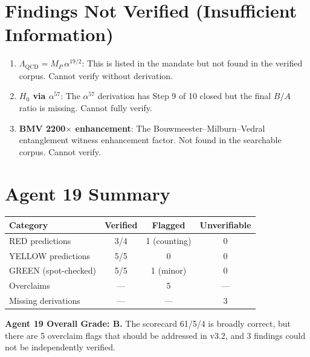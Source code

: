 \documentclass[11pt,a4paper]{article}
\begin{document}
\section{Findings Not Verified (Insufficient Information)}

\begin{enumerate}
\item \textbf{$\Lambda_{\mathrm{QCD}} = M_P\,\alpha^{19/2}$}: This is listed in the mandate but not found in the verified corpus. Cannot verify without derivation.

\item \textbf{$H_0$ via $\alpha^{57}$}: The $\alpha^{57}$ derivation has Step 9 of 10 closed but the final $B/A$ ratio is missing. Cannot fully verify.

\item \textbf{BMV 2200$\times$ enhancement}: The Bouwmeester--Milburn--Vedral entanglement witness enhancement factor. Not found in the searchable corpus. Cannot verify.
\end{enumerate}

\section{Agent 19 Summary}

\begin{center}
\begin{tabular}{lccc}
\toprule
\textbf{Category} & \textbf{Verified} & \textbf{Flagged} & \textbf{Unverifiable} \\
\midrule
RED predictions & 3/4 & 1 (counting) & 0 \\
YELLOW predictions & 5/5 & 0 & 0 \\
GREEN (spot-checked) & 5/5 & 1 (minor) & 0 \\
Overclaims & --- & 5 & --- \\
Missing derivations & --- & --- & 3 \\
\bottomrule
\end{tabular}
\end{center}

\textbf{Agent 19 Overall Grade: B.} The scorecard 61/5/4 is broadly correct, but there are 5 overclaim flags that should be addressed in v3.2, and 3 findings could not be independently verified.
\end{document}

